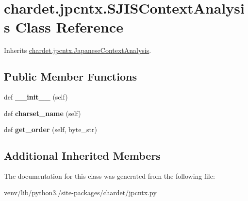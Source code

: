 \hypertarget{classchardet_1_1jpcntx_1_1_s_j_i_s_context_analysis}{}\section{chardet.\+jpcntx.\+S\+J\+I\+S\+Context\+Analysis Class Reference}
\label{classchardet_1_1jpcntx_1_1_s_j_i_s_context_analysis}


Inherits \hyperlink{classchardet_1_1jpcntx_1_1_japanese_context_analysis}{chardet.\+jpcntx.\+Japanese\+Context\+Analysis}.

\subsection*{Public Member Functions}
\begin{DoxyCompactItemize}
\item 
\mbox{\label{classchardet_1_1jpcntx_1_1_s_j_i_s_context_analysis_ad2054f9c2574e82c081e531193a66733}} 
def {\bfseries \+\_\+\+\_\+init\+\_\+\+\_\+} (self)
\item 
\mbox{\label{classchardet_1_1jpcntx_1_1_s_j_i_s_context_analysis_a82688924afecd5dbfb1f2ac13ea73c9f}} 
def {\bfseries charset\+\_\+name} (self)
\item 
\mbox{\label{classchardet_1_1jpcntx_1_1_s_j_i_s_context_analysis_a7eeaee6e8c6ed33f1b7023943fa10ae7}} 
def {\bfseries get\+\_\+order} (self, byte\+\_\+str)
\end{DoxyCompactItemize}
\subsection*{Additional Inherited Members}


The documentation for this class was generated from the following file\+:\begin{DoxyCompactItemize}
\item 
venv/lib/python3./site-\/packages/chardet/jpcntx.\+py\end{DoxyCompactItemize}
